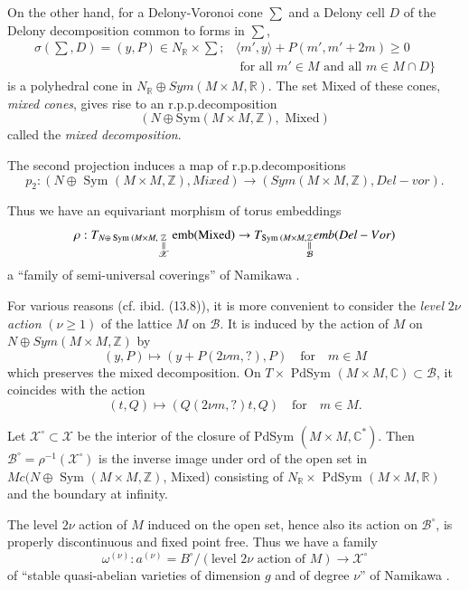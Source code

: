 On the other hand, for a Delony-Voronoi cone $\sum$ and a Delony cell
$D$ of the Delony decomposition common to forms in $\sum$, 
\begin{align*}
\sigma (\sum, D) =  (y, P) \in N_\mathbb{R} \times \sum ; &\langle m', y
\rangle + P(m', m' + 2m ) \ge 0 \\ 
&\text{ for all } m' \in M \text{ and all } m \in M \cap D  \bigg\} 
 \end{align*}
  is a polyhedral cone in $N_\mathbb{R} \oplus Sym (M \times M,
  \mathbb{R})$. The set Mixed of these cones, \textit{mixed cones},
  gives rise to an r.p.p.decomposition 
 $$
 (N \oplus \text{Sym}(M \times M, \mathbb{Z}), \text{ Mixed}) 
 $$
 called the \textit{mixed decomposition}.
 
 The second projection induces a map of r.p.p.decompositions 
$$
p_2 :
  (N \oplus \text{ Sym }(M \times M, \mathbb{Z}), Mixed) \to (Sym (M \times M,
 \mathbb{Z}), Del-vor). 
$$\pageoriginale
 
 \noindent
 Thus we have an equivariant morphism of torus embeddings
 $$
\rho : T_{N \oplus\text{ Sym }(M \times M, \underset{\substack{||
       \\ \mathscr{X}}}{\mathbb{Z}}}  \operatorname{emb} (\text{Mixed}) \to T_{\text{Sym
   }(M \times M, \underset{\substack{|| \\ \mathcal{B}}}{\mathbb{Z}}}
 emb(Del-Vor)  
$$
a ``family of semi-universal coverings'' of Namikawa
\cite[\S.~8]{keyN5}.  
 
 For various reasons (cf. ibid. (13.8)), it is more convenient to
 consider the \textit{level} $2 \nu$ \textit{action} $(\nu \geq 1)$
 of the lattice $M$ on $\mathcal{B}$. It is induced by the action of
 $M$ on $N \oplus Sym (M \times M, \mathbb{Z})$ by  
 $$
 (y, P) \mapsto (y + P (2\nu m, ?), P) \quad \text{for} \quad  m \in M   
 $$
 which preserves the mixed decomposition. On $T \times $ PdSym $(M \times M,
 \mathbb{C}) \subset \mathcal{B}$, it coincides with the action 
 $$
 (t, Q ) \mapsto (Q (2\nu m, ?) t, Q) \quad \text{for} \quad m \in M.    
 $$
 
 Let $\mathscr{X}^\circ \subset \mathscr{X} $ be the interior of the
 closure of PdSym $(M \times M, \mathbb{C}^*)$. Then
 $\mathcal{B}^{\circ} = \rho^{-1} (\mathscr{X}^\circ)$ is the inverse
 image under ord of the 
 open set in $Mc (N \oplus \text{ Sym }(M \times M, \mathbb{Z})$, Mixed)
 consisting of $N_\mathbb{R} \times $ PdSym $(M \times M, \mathbb{R})$ and the
 boundary at infinity. 
 
 The level $2 \nu$ action of $M$ induced on the open set, hence also
 its action on $\mathcal{B}^\circ$, is properly discontinuous and
 fixed point free. Thus we have a family  
 $$
\omega^{(\nu)} : a^{(\nu)} = B^\circ /  (\text{level $2 \nu$ action of
 $M$}) \to \mathscr{X}^\circ
$$ 
  of ``stable quasi-abelian varieties of dimension $g$ and of degree
  $\nu$'' of Namikawa \cite[\S.~13]{keyN5}. 

